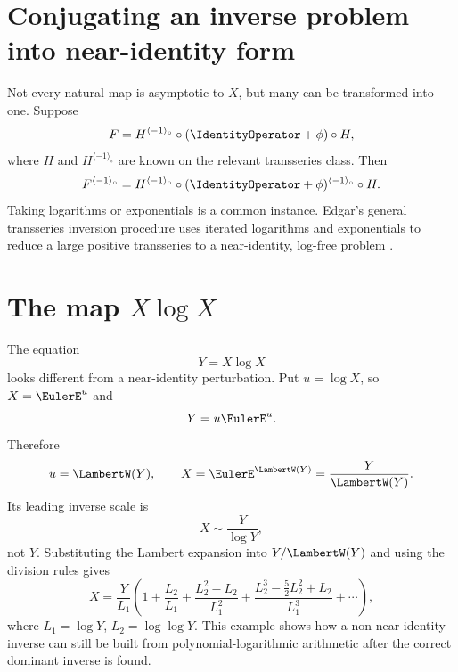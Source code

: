 \documentclass[11pt,oneside,openany]{book}
\newcommand{\compose}{\mathbin{\circ}}
\newcommand{\rev}{^{\langle-1\rangle_{\circ}}}
\begin{document}
\section{Conjugating an inverse problem into near-identity form}
Not every natural map is asymptotic to \(X\), but many can be transformed into
one.  Suppose
\begin{equation}\label{eq:conjugateproblem}
 F=H\rev\compose(\IdentityOperator+\phi)\compose H,
\end{equation}
where \(H\) and \(H\rev\) are known on the relevant transseries class.  Then
\begin{equation}\label{eq:conjugateinverse}
 F\rev=H\rev\compose(\IdentityOperator+\phi)\rev\compose H.
\end{equation}
Taking logarithms or exponentials is a common instance.  Edgar's general
transseries inversion procedure uses iterated logarithms and exponentials to
reduce a large positive transseries to a near-identity, log-free problem
\cite{EdgarComposition,EdgarBeginners}.

\section{The map \texorpdfstring{\(X\log X\)}{X log X}}
The equation
\begin{equation}\label{eq:XlogXeq}
 Y=X\log X
\end{equation}
looks different from a near-identity perturbation.  Put \(u=\log X\), so
\(X=\EulerE^u\) and
\[
 Y=u\EulerE^u.
\]
Therefore
\begin{equation}\label{eq:XlogXexact}
 u=\LambertW(Y),
 \qquad
 X=\EulerE^{\LambertW(Y)}=\frac{Y}{\LambertW(Y)}.
\end{equation}
Its leading inverse scale is
\begin{equation}\label{eq:XlogXleading}
 X\sim\frac{Y}{\log Y},
\end{equation}
not \(Y\).  Substituting the Lambert expansion into \(Y/\LambertW(Y)\) and using the
division rules gives
\begin{equation}\label{eq:XlogXexpansion}
 X=\frac{Y}{L_1}\left(
 1+\frac{L_2}{L_1}
 +\frac{L_2^2-L_2}{L_1^2}
 +\frac{L_2^3-\frac52L_2^2+L_2}{L_1^3}
 +\cdots
 \right),
\end{equation}
where \(L_1=\log Y\), \(L_2=\log\log Y\).  This example shows how a
non-near-identity inverse can still be built from polynomial-logarithmic
arithmetic after the correct dominant inverse is found.
\end{document}
